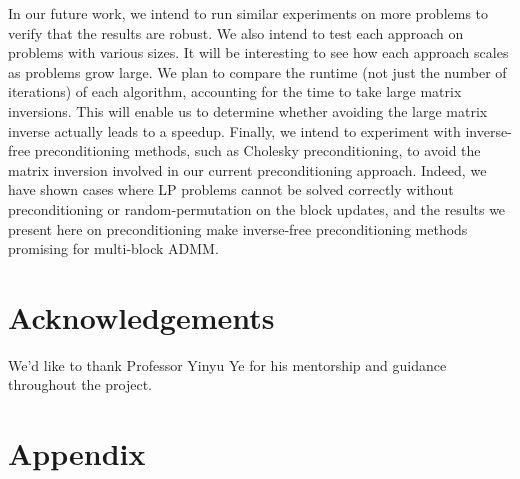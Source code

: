 \documentclass{article}
\begin{document}
In our future work, we intend to run similar experiments on more problems to verify that the results are robust. We also intend to test each approach on problems with various sizes. It will be interesting to see how each approach scales as problems grow large. We plan to compare the runtime (not just the number of iterations) of each algorithm, accounting for the time to take large matrix inversions. This will enable us to determine whether avoiding the large matrix inverse actually leads to a speedup. Finally, we intend to experiment with inverse-free preconditioning methods, such as Cholesky preconditioning, to avoid the matrix inversion involved in our current preconditioning approach. Indeed, we have shown cases where LP problems cannot be solved correctly without preconditioning or random-permutation on the block updates, and the results we present here on preconditioning make inverse-free preconditioning methods promising for multi-block ADMM.

\section{Acknowledgements}

We'd like to thank Professor Yinyu Ye for his mentorship and guidance throughout the project. 

\section{Appendix}
\end{document}
